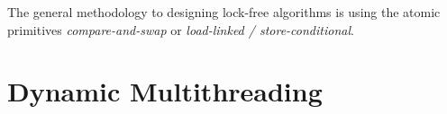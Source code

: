 The general methodology to designing lock\hyp{}free algorithms is using the atomic primitives \textit{compare\hyp{}and\hyp{}swap} or \textit{load\hyp{}linked / store\hyp{}conditional}. 


\section{Dynamic Multithreading}
\label{sec:dynamic_multithreading}




